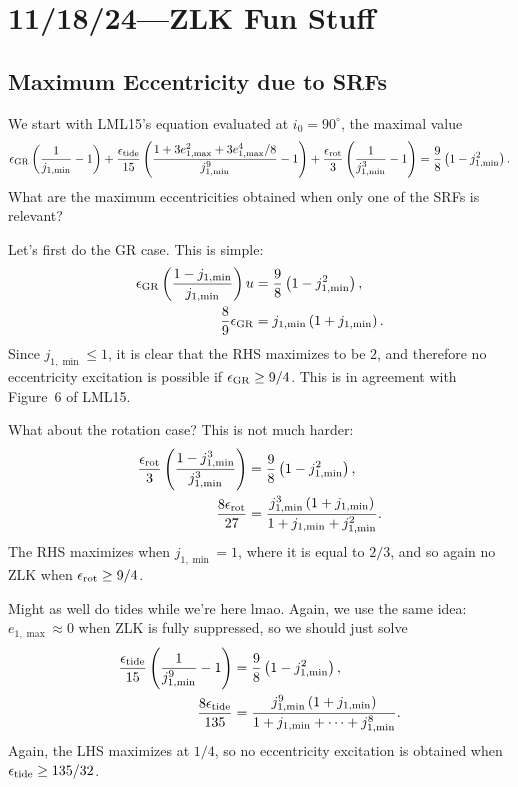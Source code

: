 \documentclass[12pt]{article}
\newcommand*{\p}[1]{\left(#1\right)}
\newcommand*{\z}[1]{\left\{#1\right\}}
\begin{document}
\section{11/18/24---ZLK Fun Stuff}

\subsection{Maximum Eccentricity due to SRFs}

We start with LML15's equation evaluated at $i_0 = 90^\circ$, the maximal value
\begin{align}
    \epsilon_{\rm GR} \p{\frac{1}{j_{1,\min}} - 1}
        + \frac{\epsilon_{\rm tide}}{15}
            \p{\frac{1 + 3e_{1,\max}^2 + 3e_{1,\max}^4/8}{j_{1,\min}^9} - 1}
        + \frac{\epsilon_{\rm rot}}{3}
            \p{\frac{1}{j_{1,\min}^3} - 1}
        = \frac{9}{8}\p{1 - j_{1,\min}^2}.
\end{align}
What are the maximum eccentricities obtained when only one of the SRFs is
relevant?

Let's first do the GR case. This is simple:
\begin{align}
    \epsilon_{\rm GR} \p{\frac{1 - j_{1, \min}}{j_{1,\min}}}
        u&= \frac{9}{8} \p{1 - j_{1,\min}^2},\\
    \frac{8}{9}\epsilon_{\rm GR}
        &= j_{1,\min}\p{1 + j_{1,\min}}.
\end{align}
Since $j_{1,\min} \leq 1$, it is clear that the RHS maximizes to be $2$, and
therefore no eccentricity excitation is possible if $\epsilon_{\rm GR} \geq
9/4$. This is in agreement with Figure~6 of LML15.

What about the rotation case? This is not much harder:
\begin{align}
    \frac{\epsilon_{\rm rot}}{3} \p{\frac{1 - j_{1,\min}^3}{j_{1,\min}^3}}
        &= \frac{9}{8}\p{1 - j_{1,\min}^2},\\
    \frac{8\epsilon_{\rm rot}}{27}
        &= \frac{j_{1,\min}^3\p{1 + j_{1,\min}}}{1 + j_{1,\min} + j_{1,\min}^2}.
\end{align}
The RHS maximizes when $j_{1,\min} = 1$, where it is equal to $2/3$, and so
again no ZLK when $\epsilon_{\rm rot} \geq 9/4$.

Might as well do tides while we're here lmao. Again, we use the same idea:
$e_{1, \max} \approx 0$ when ZLK is fully suppressed, so we should just solve
\begin{align}
    \frac{\epsilon_{\rm tide}}{15}\p{\frac{1}{j_{1,\min}^9} - 1}
        &= \frac{9}{8}\p{1 - j_{1,\min}^2},\\
    \frac{8\epsilon_{\rm tide}}{135}
        &= \frac{j_{1,\min}^9\p{1 + j_{1,\min}}}{
            1 + j_{1,\min} +\dots+ j_{1,\min}^8}.
\end{align}
Again, the LHS maximizes at $1/4$, so no eccentricity excitation is obtained
when $\epsilon_{\rm tide} \geq 135/32$.
\end{document}

